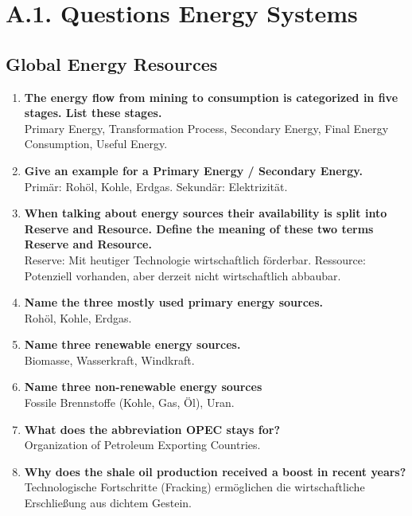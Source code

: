 \documentclass{article}
\begin{document}
\section*{A.1. Questions Energy Systems}

\subsection*{Global Energy Resources}
\begin{enumerate}
    \item \textbf{The energy flow from mining to consumption is categorized in five stages. List these stages.} \\
    Primary Energy, Transformation Process, Secondary Energy, Final Energy Consumption, Useful Energy.
    \item \textbf{Give an example for a Primary Energy / Secondary Energy.} \\
    Primär: Rohöl, Kohle, Erdgas. Sekundär: Elektrizität.
    \item \textbf{When talking about energy sources their availability is split into Reserve and Resource. Define the meaning of these two terms Reserve and Resource.} \\
    Reserve: Mit heutiger Technologie wirtschaftlich förderbar. Ressource: Potenziell vorhanden, aber derzeit nicht wirtschaftlich abbaubar.
    \item \textbf{Name the three mostly used primary energy sources.} \\
    Rohöl, Kohle, Erdgas.
    \item \textbf{Name three renewable energy sources.} \\
    Biomasse, Wasserkraft, Windkraft.
    \item \textbf{Name three non-renewable energy sources} \\
    Fossile Brennstoffe (Kohle, Gas, Öl), Uran.
    \item \textbf{What does the abbreviation OPEC stays for?} \\
    Organization of Petroleum Exporting Countries.
    \item \textbf{Why does the shale oil production received a boost in recent years?} \\
    Technologische Fortschritte (Fracking) ermöglichen die wirtschaftliche Erschließung aus dichtem Gestein.
\end{enumerate}
\end{document}
